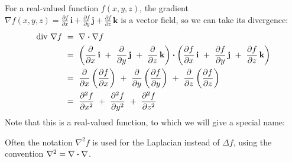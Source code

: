 For a real-valued function $f(x,y,z)$, the gradient $\nabla f(x,y,z) =\frac{\partial f}{\partial x}\,\textbf{i} +
\frac{\partial f}{\partial y}\,\textbf{j} + \frac{\partial f}{\partial z}\,\textbf{k}$ is a vector field, so we
can take its divergence:
\begin{align*}
 \text{div}~\nabla f ~&=~ \nabla \bm{\cdot} \nabla f\\
  &=~ \left( \frac{\partial}{\partial x}\,\textbf{i} ~+~ \frac{\partial}{\partial y}\,\textbf{j} ~+~
  \frac{\partial}{\partial z}\,\textbf{k} \right)  \bm{\cdot} \left( \frac{\partial f}{\partial x}\,\textbf{i} ~+~
  \frac{\partial f}{\partial y}\,\textbf{j} ~+~ \frac{\partial f}{\partial z}\,\textbf{k} \right)\\
  &=~ \frac{\partial}{\partial x}\left( \frac{\partial f}{\partial x} \right) ~+~
   \frac{\partial}{\partial y}\left( \frac{\partial f}{\partial y} \right) ~+~
   \frac{\partial}{\partial z}\left( \frac{\partial f}{\partial z} \right)\\
  &=~ \frac{\partial^2 f}{\partial x^2} ~+~ \frac{\partial^2 f}{\partial y^2} ~+~ \frac{\partial^2 f}{\partial z^2}
\end{align*}
Note that this is a real-valued function, to which we will give a special name:

Often the notation $\nabla^2 f$ is used for the Laplacian instead of $\Delta f$, using the convention
$\nabla^2 = \nabla \bm{\cdot} \nabla$.\index{$\Delta$}

